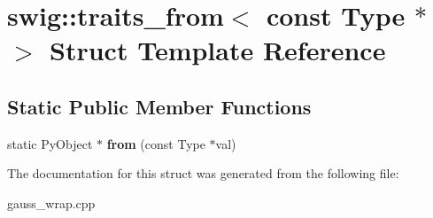 \hypertarget{structswig_1_1traits__from_3_01const_01_type_01_5_01_4}{\section{swig\-:\-:traits\-\_\-from$<$ const Type $\ast$ $>$ Struct Template Reference}
\label{structswig_1_1traits__from_3_01const_01_type_01_5_01_4}
}
\subsection*{Static Public Member Functions}
\begin{DoxyCompactItemize}
\item 
\hypertarget{structswig_1_1traits__from_3_01const_01_type_01_5_01_4_ae36dbdb3c905af0dab508e7bf360a8d6}{static Py\-Object $\ast$ {\bfseries from} (const Type $\ast$val)}\label{structswig_1_1traits__from_3_01const_01_type_01_5_01_4_ae36dbdb3c905af0dab508e7bf360a8d6}

\end{DoxyCompactItemize}


The documentation for this struct was generated from the following file\-:\begin{DoxyCompactItemize}
\item 
gauss\-\_\-wrap.\-cpp\end{DoxyCompactItemize}
